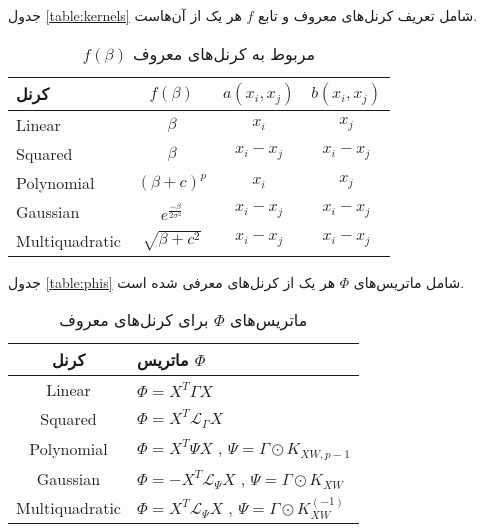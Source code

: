 جدول
\eqref{table:kernels}
شامل تعریف کرنل‌های معروف 
و تابع
$f$
هر یک از آن‌هاست.
\begin{table}[h!]   
	\begin{center}
		\begin{tabular}{l|c|c|c}
			کرنل & $f(\beta)$ & $a(x_i,x_j)$ & $b(x_i, x_j)$\\ \hline
			Linear & $\beta$ & $x_i$ & $x_j$ \\
			Squared & $\beta$ & $x_i-x_j$ & $x_i-x_j$ \\
			Polynomial & $(\beta + c)^p$ & $x_i$ & $x_j$ \\
			Gaussian &  $e^\frac{-\beta}{2\sigma^2}$ & $x_i-x_j$ & $x_i-x_j$ \\
			Multiquadratic & $\sqrt{\beta+c^2}$ & $x_i-x_j$ & $x_i-x_j$ \\
		\end{tabular}
		\caption {$f(\beta)$
			مربوط به کرنل‌های معروف	
		}
		\label{table:kernels}
	\end{center}
\end{table}





جدول 
\eqref{table:phis}
شامل ماتریس‌های
$\Phi$
هر یک از کرنل‌های معرفی شده است.
\begin{table}[h!]
	\centering
	\begin{tabular}{c|l}
		کرنل &ماتریس
		$\Phi$
		\\
		\midrule
		Linear
		& $\Phi=X^T\Gamma X$ \\
		Squared
		& $\Phi=X^T \mathcal{L}_{\Gamma}X$ \\  
		Polynomial
		& $\Phi=X^T\Psi X$ 
		\hspace{0.2cm}
		,
		\hspace{0.2cm}           	
		$\Psi = \Gamma \odot K_{XW,p-1}$ \\ 
		Gaussian
		& $\Phi=-X^T\mathcal{L}_{\Psi} X$ 
		,
		$\Psi = \Gamma \odot K_{XW}$\\
		Multiquadratic
		& $\Phi=X^T\mathcal{L}_{\Psi} X$ 
		,
		$\Psi = \Gamma \odot K_{XW}^{(-1)}$\\ 
		\bottomrule       
	\end{tabular}
	\caption{ ماتریس‌های 
		$\Phi$	
		برای کرنل‌های معروف
	}
	\label{table:phis}
\end{table}





